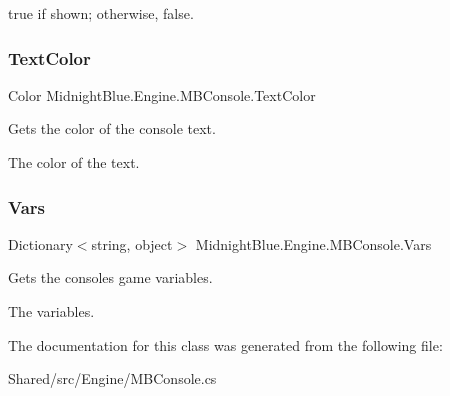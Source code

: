 {\ttfamily true} if shown; otherwise, {\ttfamily false}.\hypertarget{class_midnight_blue_1_1_engine_1_1_m_b_console_a4acc1ac4ccea1003f4a0d8f878f91a23}{}\label{class_midnight_blue_1_1_engine_1_1_m_b_console_a4acc1ac4ccea1003f4a0d8f878f91a23} 
\subsubsection{\texorpdfstring{Text\+Color}{TextColor}}
{\footnotesize\ttfamily Color Midnight\+Blue.\+Engine.\+M\+B\+Console.\+Text\+Color\hspace{0.3cm}{\ttfamily [get]}}



Gets the color of the console text. 

The color of the text.\hypertarget{class_midnight_blue_1_1_engine_1_1_m_b_console_a504f6353e1d2ad63f4cb471e4107ba50}{}\label{class_midnight_blue_1_1_engine_1_1_m_b_console_a504f6353e1d2ad63f4cb471e4107ba50} 
\subsubsection{\texorpdfstring{Vars}{Vars}}
{\footnotesize\ttfamily Dictionary$<$string, object$>$ Midnight\+Blue.\+Engine.\+M\+B\+Console.\+Vars\hspace{0.3cm}{\ttfamily [get]}}



Gets the consoles game variables. 

The variables.

The documentation for this class was generated from the following file\+:\begin{DoxyCompactItemize}
\item 
Shared/src/\+Engine/M\+B\+Console.\+cs\end{DoxyCompactItemize}
